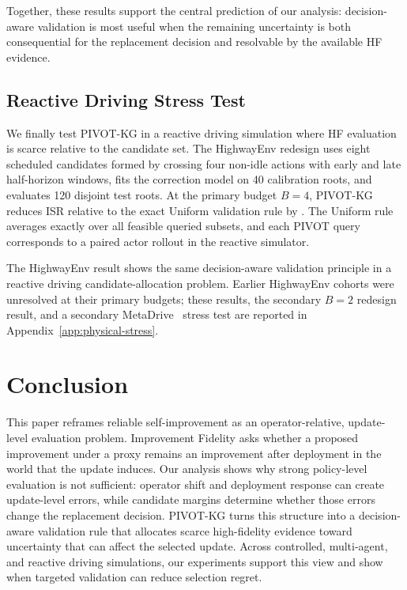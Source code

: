 \documentclass{article}
\begin{document}
Together, these results support the central prediction of our analysis:
decision-aware validation is most useful when the remaining uncertainty is
both consequential for the replacement decision and resolvable by the
available HF evidence.

\subsection{Reactive Driving Stress Test}
\label{sec:exp-highway}

We finally test PIVOT-KG in a reactive driving simulation where HF evaluation
is scarce relative to the candidate set. The HighwayEnv redesign uses eight
scheduled candidates formed by crossing four non-idle actions with early and
late half-horizon windows, fits the correction model on 40 calibration roots,
and evaluates 120 disjoint test roots. At the primary budget $B=4$, PIVOT-KG
reduces ISR relative to the exact Uniform validation rule by
\HighwayRedesignBudgetFourContrast{} \HighwayRedesignBudgetFourCI{}.
The Uniform rule averages exactly over all feasible queried subsets, and
each PIVOT query corresponds to a paired actor rollout in the reactive simulator.

The HighwayEnv result shows the same decision-aware validation principle in
a reactive driving candidate-allocation problem. Earlier HighwayEnv
cohorts were unresolved at their primary budgets; these results, the secondary
$B=2$ redesign result, and a secondary
MetaDrive~\citep{li2022metadrive} stress test are reported in
Appendix~\ref{app:physical-stress}.


\FloatBarrier
\section{Conclusion}

This paper reframes reliable self-improvement as an operator-relative,
update-level evaluation problem. Improvement Fidelity asks whether a proposed
improvement under a proxy remains an improvement after deployment in the world
that the update
induces. Our analysis shows why strong policy-level evaluation is not
sufficient: operator shift and deployment response can create update-level
errors, while candidate margins determine whether those errors change the
replacement decision. PIVOT-KG turns this structure into a decision-aware
validation rule that allocates scarce high-fidelity evidence toward
uncertainty that can affect the selected update. Across controlled,
multi-agent, and reactive driving simulations, our experiments support this
view and show when targeted validation can reduce selection regret.
\end{document}
